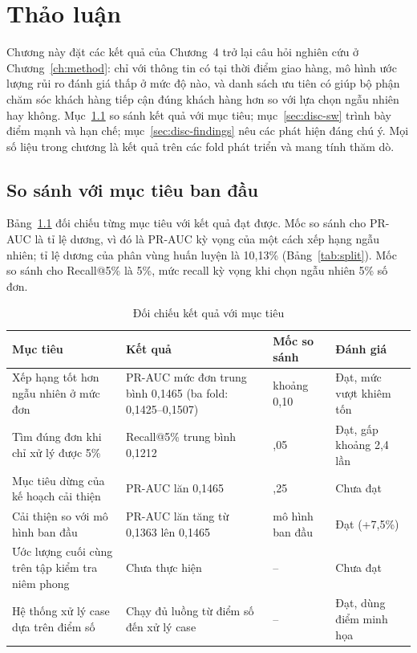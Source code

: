 \documentclass[12pt,a4paper]{report}
\begin{document}
\chapter{Thảo luận}\label{ch:discussion}

Chương này đặt các kết quả của Chương~4 trở lại câu hỏi nghiên cứu ở Chương~\ref{ch:method}: chỉ với thông tin có tại thời điểm giao hàng, mô hình ước lượng rủi ro đánh giá thấp ở mức độ nào, và danh sách ưu tiên có giúp bộ phận chăm sóc khách hàng tiếp cận đúng khách hàng hơn so với lựa chọn ngẫu nhiên hay không. Mục~\ref{sec:disc-goals} so sánh kết quả với mục tiêu; mục~\ref{sec:disc-sw} trình bày điểm mạnh và hạn chế; mục~\ref{sec:disc-findings} nêu các phát hiện đáng chú ý. Mọi số liệu trong chương là kết quả trên các fold phát triển và mang tính thăm dò.

\section{So sánh với mục tiêu ban đầu}\label{sec:disc-goals}

Bảng~\ref{tab:disc-goals} đối chiếu từng mục tiêu với kết quả đạt được. Mốc so sánh cho PR-AUC là tỉ lệ dương, vì đó là PR-AUC kỳ vọng của một cách xếp hạng ngẫu nhiên; tỉ lệ dương của phân vùng huấn luyện là 10,13\% (Bảng~\ref{tab:split}). Mốc so sánh cho Recall@5\% là 5\%, mức recall kỳ vọng khi chọn ngẫu nhiên 5\% số đơn.

\begin{table}[htbp]\centering\small
\caption{Đối chiếu kết quả với mục tiêu}\label{tab:disc-goals}
\begin{tabular}{>{\raggedright\arraybackslash}p{4.1cm}>{\raggedright\arraybackslash}p{4.6cm}>{\raggedright\arraybackslash}p{2.3cm}>{\raggedright\arraybackslash}p{2.6cm}}
\toprule
Mục tiêu & Kết quả & Mốc so sánh & Đánh giá \\
\midrule
Xếp hạng tốt hơn ngẫu nhiên ở mức đơn & PR-AUC mức đơn trung bình 0,1465 (ba fold: 0,1425--0,1507) & khoảng 0,10 & Đạt, mức vượt khiêm tốn \\
Tìm đúng đơn khi chỉ xử lý được 5\% & Recall@5\% trung bình 0,1212 & 0,05 & Đạt, gấp khoảng 2,4 lần \\
Mục tiêu dừng của kế hoạch cải thiện & PR-AUC lăn 0,1465 & 0,25 & Chưa đạt \\
Cải thiện so với mô hình ban đầu & PR-AUC lăn tăng từ 0,1363 lên 0,1465 & mô hình ban đầu & Đạt (+7,5\%) \\
Ước lượng cuối cùng trên tập kiểm tra niêm phong & Chưa thực hiện & -- & Chưa đạt \\
Hệ thống xử lý case dựa trên điểm số & Chạy đủ luồng từ điểm số đến xử lý case & -- & Đạt, dùng điểm minh họa \\
\bottomrule
\end{tabular}
\end{table}
\end{document}
